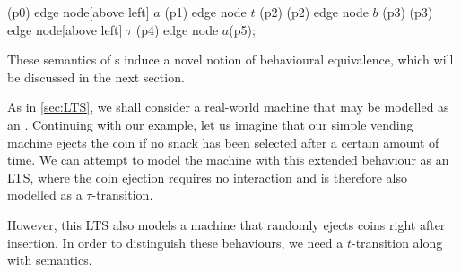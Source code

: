 \begin{isabellebody}
\begin{isamarkuptext}
{{    \path   (p0) edge node[above left]  {$a$}   (p1)
                 edge node              {$t$}   (p2)
            (p2) edge node              {$b$}   (p3)
            (p3) edge node[above left]  {$\tau$}   (p4)
                 edge node              {$a$}(p5);
}}

These semantics of \LTSt{}s induce a novel notion of behavioural equivalence, which will be discussed in the next section.%
\end{isamarkuptext}\isamarkuptrue%
%
\isadelimdocument
%
\endisadelimdocument
%
\isatagdocument
%
\isamarkuptrue%
%
\endisatagdocument
{\isafolddocument}%
%
\isadelimdocument
%
\endisadelimdocument
%
\begin{isamarkuptext}%
As in \cref{sec:LTS}, we shall consider a real-world machine that may be modelled as an \LTSt{}. Continuing with our example, let us imagine that our simple vending machine ejects the coin if no snack has been selected after a certain amount of time. We can attempt to model the machine with this extended behaviour as an LTS, where the coin ejection requires no interaction and is therefore also modelled as a $\tau$-transition.


However, this LTS also models a machine that randomly ejects coins right after insertion.
In order to distinguish these behaviours, we need a \linebreak $t$-transition along with \LTSt{} semantics.

\end{isamarkuptext}
\end{isabellebody}
